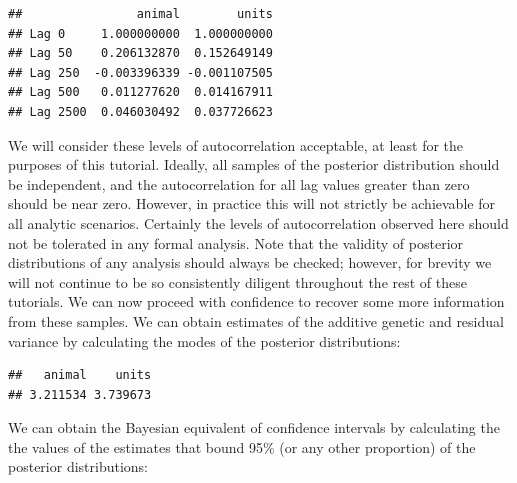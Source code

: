 \documentclass[
  12pt,
]{book}
\newenvironment{Shaded}{\begin{snugshade}}{\end{snugshade}}
\newcommand{\FloatTok}[1]{\textcolor[rgb]{0.00,0.00,0.81}{#1}}
\newcommand{\FunctionTok}[1]{\textcolor[rgb]{0.00,0.00,0.00}{#1}}
\newcommand{\NormalTok}[1]{#1}
\newcommand{\SpecialCharTok}[1]{\textcolor[rgb]{0.00,0.00,0.00}{#1}}
\begin{document}
\begin{Shaded}
\end{Shaded}

\begin{verbatim}
##                animal        units
## Lag 0     1.000000000  1.000000000
## Lag 50    0.206132870  0.152649149
## Lag 250  -0.003396339 -0.001107505
## Lag 500   0.011277620  0.014167911
## Lag 2500  0.046030492  0.037726623
\end{verbatim}

We will consider these levels of autocorrelation acceptable, at least for the purposes of this tutorial. Ideally, all samples of the posterior distribution should be independent, and the autocorrelation for all lag values greater than zero should be near zero. However, in practice this will not strictly be achievable for all analytic scenarios. Certainly the levels of autocorrelation observed here should not be tolerated in any formal analysis.
Note that the validity of posterior distributions of any analysis should always be checked; however, for brevity we will not continue to be so consistently diligent throughout the rest of these tutorials. We can now proceed with confidence to recover some more information from these samples. We can obtain estimates of the additive genetic and residual variance by calculating the modes of the posterior distributions:

\begin{Shaded}
\end{Shaded}

\begin{verbatim}
##   animal    units 
## 3.211534 3.739673
\end{verbatim}

We can obtain the Bayesian equivalent of confidence intervals by calculating the the values of the estimates that bound 95\% (or any other proportion) of the posterior distributions:

\begin{Shaded}
\end{Shaded}
\end{document}
